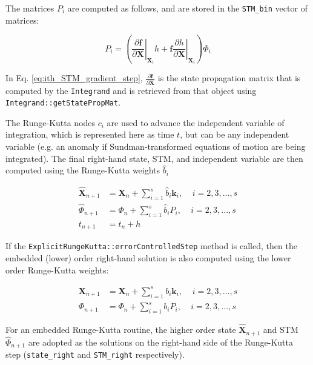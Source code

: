 \noindent The matrices $P_i$ are computed as follows, and are stored in the \texttt{STM\_bin} vector of matrices:

\begin{equation}
P_i = \left( \left. \frac{\partial \mathbf{f}}{\partial \mathbf{X}} \right|_{\mathbf{X}_{i}} h + \mathbf{f}\left. \frac{\partial h}{\partial \mathbf{X}} \right|_{\mathbf{X}_{i}} \right) \Phi_{i} \label{eq:ith_STM_gradient_step}
\end{equation}

\noindent In Eq. \ref{eq:ith_STM_gradient_step}, $\frac{\partial \mathbf{f}}{\partial \mathbf{X}}$ is the state propagation matrix that is computed by the \texttt{Integrand} and is retrieved from that object using \texttt{Integrand::getStatePropMat}.

\noindent The Runge-Kutta nodes $c_i$ are used to advance the independent variable of integration, which is represented here as time $t$, but can be any independent variable (e.g. an anomaly if Sundman-transformed equations of motion are being integrated). The final right-hand state, STM, and independent variable are then computed using the Runge-Kutta weights $\hat{b}_i$ 


\begin{align}
\hat{\mathbf{X}}_{n+1} &= \mathbf{X}_{n} + \sum^s_{i=1} \hat{b}_i \mathbf{k}_i, ~~~~~ i = 2,3,...,s \label{eq:ExplicitRKstateStep}\\
\hat{\Phi}_{n+1} &= \Phi_{n} + \sum^s_{i=1} \hat{b}_i P_i, ~~~~~ i = 2,3,...,s \label{eq:ExplicitRKphiStep}\\
t_{n+1} &= t_n + h \label{eq:timestep}
\end{align} 
 
\noindent If the \texttt{ExplicitRungeKutta::errorControlledStep} method is called, then the embedded (lower) order right-hand solution is also computed using the lower order Runge-Kutta weights:

\begin{align}
\mathbf{X}_{n+1} &= \mathbf{X}_{n} + \sum^s_{i=1} b_i \mathbf{k}_i, ~~~~~ i = 2,3,...,s \label{eq:ExplicitRKstateStep_lower}\\
\Phi_{n+1} &= \Phi_{n} + \sum^s_{i=1} b_i P_i, ~~~~~ i = 2,3,...,s \label{eq:ExplicitRKphiStep_lower}
\end{align}

\noindent For an embedded Runge-Kutta routine, the higher order state $\hat{\mathbf{X}}_{n+1}$ and STM $\hat{\Phi}_{n+1}$ are adopted as the solutions on the right-hand side of the Runge-Kutta step (\texttt{state\_right} and \texttt{STM\_right} respectively).


